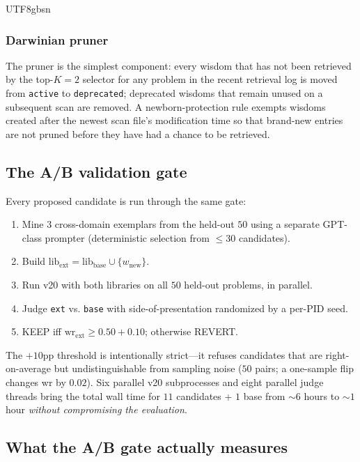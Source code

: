 \documentclass{article}
\begin{document}
\begin{CJK*}{UTF8}{gbsn}
\subsubsection{Darwinian pruner}
\label{sec:prune}

The pruner is the simplest component: every wisdom that has not
been retrieved by the top-\(K{=}2\) selector for any problem in
the recent retrieval log is moved from \texttt{active} to
\texttt{deprecated}; deprecated wisdoms that remain unused on a
subsequent scan are removed. A newborn-protection rule exempts
wisdoms created after the newest scan file's modification time
so that brand-new entries are not pruned before they have had a
chance to be retrieved.

\subsection{The A/B validation gate}
\label{sec:gate}

Every proposed candidate is run through the same gate:
\begin{enumerate}[topsep=2pt,itemsep=2pt,leftmargin=*]
  \item Mine \(3\) cross-domain exemplars from the held-out \(50\) using
    a separate GPT-class prompter (deterministic selection from
    \(\leq 30\) candidates).
  \item Build \(\text{lib}_{\text{ext}} = \text{lib}_{\text{base}}
    \cup \{w_{\text{new}}\}\).
  \item Run v20 with both libraries on all \(50\) held-out problems,
    in parallel.
  \item Judge \texttt{ext} vs. \texttt{base} with side-of-presentation
    randomized by a per-PID seed.
  \item KEEP iff \(\text{wr}_{\text{ext}} \geq 0.50 + 0.10\); otherwise
    REVERT.
\end{enumerate}

\noindent The \(+10\)pp threshold is intentionally strict—it refuses
candidates that are right-on-average but undistinguishable from
sampling noise (\(50\) pairs; a one-sample flip changes wr by \(0.02\)).
Six parallel v20 subprocesses and eight parallel judge threads bring
the total wall time for \(11\) candidates + \(1\) base from
\({\sim}6\) hours to \({\sim}1\) hour \emph{without compromising the
evaluation}.

\subsection{What the A/B gate actually measures}
\label{sec:theory}


\end{CJK*}
\end{document}
